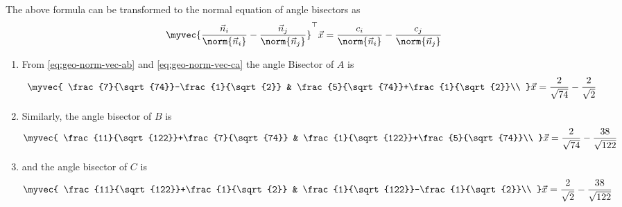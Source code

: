 \solution 
The above formula can 
be transformed to the normal equation of angle bisectors as  
\begin{align}
       \myvec{\frac{\vec{n}_i}{\norm{\vec{n}_i}} - \frac{\vec{n}_j}{\norm{\vec{n}_j}}}^{\top}\vec{x}
       =
       \frac{c_i}{\norm{\vec{n}_i}}-\frac{c_j}{\norm{\vec{n}_j}}
\end{align}
\begin{enumerate}
\item From 
		\eqref{eq:geo-norm-vec-ab}
		and 
		\eqref{eq:geo-norm-vec-ca}
the angle Bisector of $A$ is 
\begin{align}
\myvec{
\frac{7}{\sqrt{74}}-\frac{1}{\sqrt{2}} & \frac{5}{\sqrt{74}}+\frac{1}{\sqrt{2}}\\
}
\vec{x}
=\frac{2}{\sqrt{74}}-\frac{2}{\sqrt{2}}
\end{align}
\item Similarly, the angle bisector of $B$ is 
\begin{align}
\myvec{
\frac{11}{\sqrt{122}}+\frac{7}{\sqrt{74}} & \frac{1}{\sqrt{122}}+\frac{5}{\sqrt{74}}\\
}
\vec{x}
=\frac{2}{\sqrt{74}}-\frac{38}{\sqrt{122}}
\end{align}
\item and the angle bisector of $C$ is 
\begin{align}
\myvec{
\frac{11}{\sqrt{122}}+\frac{1}{\sqrt{2}} & \frac{1}{\sqrt{122}}-\frac{1}{\sqrt{2}}\\
}
\vec{x}
=\frac{2}{\sqrt{2}}-\frac{38}{\sqrt{122}}
\end{align}
\end{enumerate}
